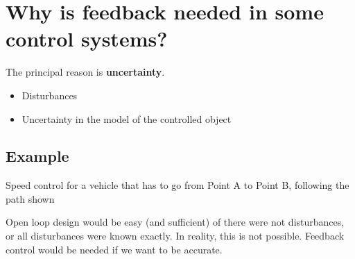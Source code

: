 \documentclass{book}
\begin{document}
\section*{Why is feedback needed in some control systems?}
The principal reason is \textbf{uncertainty}.
\begin{itemize}
	\item Disturbances
	\item Uncertainty in the model of the controlled object
\end{itemize}

\subsection*{Example}
Speed control for a vehicle that has to go from Point A to Point B, following the path shown
\begin{center}
\end{center}
Open loop design would be easy (and sufficient) of there were not disturbances, or all disturbances were known exactly. In reality, this is not possible. Feedback control would be needed if we want to be accurate.
\end{document}
